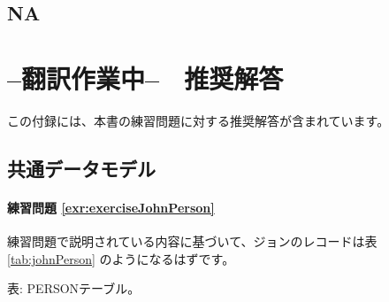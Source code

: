 \documentclass[
  11pt]{book}
\theoremstyle{definition}
\theoremstyle{definition}
\theoremstyle{definition}
\theoremstyle{definition}
\theoremstyle{remark}
\begin{document}
\section{NA}\label{na}

\chapter{--翻訳作業中--　推奨解答}\label{SuggestedAnswers}

この付録には、本書の練習問題に対する推奨解答が含まれています。

\section{共通データモデル}\label{Cdmanswers}

\subsubsection*{練習問題 \ref{exr:exerciseJohnPerson}}\label{ux7df4ux7fd2ux554fux984c-refexrexercisejohnperson}

練習問題で説明されている内容に基づいて、ジョンのレコードは表 \ref{tab:johnPerson} のようになるはずです。

表: \label{tab:johnPerson} PERSONテーブル。
\end{document}
